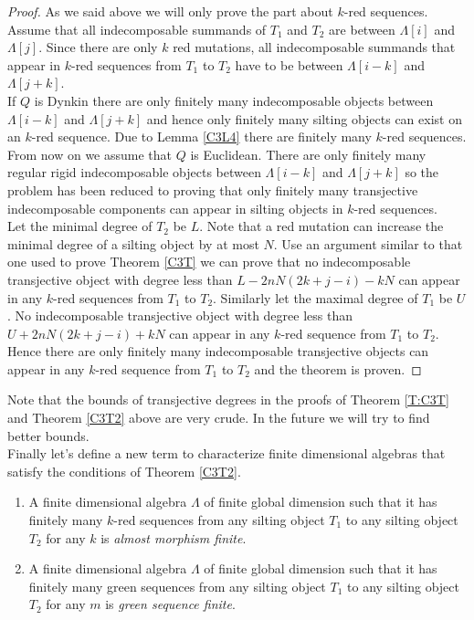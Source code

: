 \begin{proof}
\indent As we said above we will only prove the part about $k$-red sequences. Assume that all indecomposable summands of $T_1$ and $T_2$ are between $\Lambda[i]$ and $\Lambda[j]$. Since there are only $k$ red mutations, all indecomposable summands that appear in $k$-red sequences from $T_1$ to $T_2$ have to be between $\Lambda[i-k]$ and $\Lambda[j+k]$.\\ 
\indent If $Q$ is Dynkin there are only finitely many indecomposable objects between $\Lambda[i-k]$ and $\Lambda[j+k]$ and hence only finitely many silting objects can exist on an $k$-red sequence. Due to Lemma \ref{C3L4} there are finitely many $k$-red sequences. \\
\indent From now on we assume that $Q$ is Euclidean. There are only finitely many regular rigid indecomposable objects between $\Lambda[i-k]$ and $\Lambda[j+k]$ so the problem has been reduced to proving that only finitely many transjective indecomposable components can appear in silting objects in $k$-red sequences.\\
\indent Let the minimal degree of $T_2$ be $L$. Note that a red mutation can increase the minimal degree of a silting object by at most $N$. Use an argument similar to that one used to prove Theorem \ref{C3T} we can prove that no indecomposable transjective object with degree less than $L-2nN(2k+j-i)-kN$ can appear in any $k$-red sequences from $T_1$ to $T_2$. Similarly let the maximal degree of $T_1$ be $U$. No indecomposable transjective object with degree less than $U+2nN(2k+j-i)+kN$ can appear in any $k$-red sequence from $T_1$ to $T_2$. Hence there are only finitely many indecomposable transjective objects can appear in any $k$-red sequence from $T_1$ to $T_2$ and the theorem is proven.
\end{proof}
\indent Note that the bounds of transjective degrees in the proofs of Theorem \ref{T:C3T} and Theorem \ref{C3T2} above are very crude. In the future we will try to find better bounds.\\
\indent Finally let's define a new term to characterize finite dimensional algebras that satisfy the conditions of Theorem \ref{C3T2}.\\
\begin{definition}
\begin{enumerate}
\item A finite dimensional algebra $\Lambda$ of finite global dimension such that it has finitely many $k$-red sequences from any silting object $T_1$ to any silting object $T_2$ for any $k$ is \textit{almost morphism finite}.
\item A finite dimensional algebra $\Lambda$ of finite global dimension such that it has finitely many green sequences from any silting object $T_1$ to any silting object $T_2$ for any $m$ is \textit{green sequence finite}.
\end{enumerate}
\end{definition}
